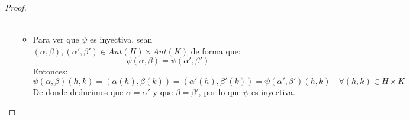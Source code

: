 \begin{prop}
\begin{proof}
\begin{enumerate}
\begin{itemize}
\begin{align*}
                        \end{align*}
                    \item Para ver que $\psi$ es inyectiva, sean $(\alpha,\beta),(\alpha',\beta')\in Aut(H)\times Aut(K)$ de forma que:
                        \begin{equation*}
                            \psi(\alpha,\beta) = \psi(\alpha',\beta')
                        \end{equation*}
                        Entonces:
                        \begin{equation*}
                            \psi(\alpha,\beta)(h,k) = (\alpha(h), \beta(k)) = (\alpha'(h), \beta'(k)) = \psi(\alpha',\beta')(h,k) \quad \forall (h,k)\in H\times K
                        \end{equation*}
                        De donde deducimos que $\alpha = \alpha'$ y que $\beta = \beta'$, por lo que $\psi$ es inyectiva.
                \end{itemize}
        \end{enumerate}
    \end{proof}
\end{prop}

